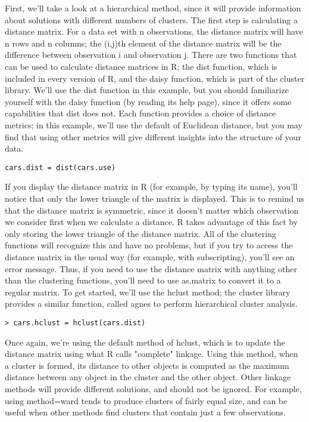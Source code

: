 {First, we'll take a look at a hierarchical method, since it will provide information about solutions with different numbers of clusters. The first step is calculating a distance matrix. For a data set with n observations, the distance matrix will have n rows and n columns; the (i,j)th element of the distance matrix will be the difference between observation i and observation j. There are two functions that can be used to calculate distance matrices in R; the dist function, which is included in every version of R, and the daisy function, which is part of the cluster library. We'll use the dist function in this example, but you should familiarize yourself with the daisy function (by reading its help page), since it offers some capabilities that dist does not. Each function provides a choice of distance metrics; in this example, we'll use the default of Euclidean distance, but you may find that using other metrics will give different insights into the structure of your data.
\begin{framed}
\begin{verbatim}
cars.dist = dist(cars.use)
\end{verbatim}
\end{framed}
If you display the distance matrix in R (for example, by typing its name), you'll notice that only the lower triangle of the matrix is displayed. This is to remind us that the distance matrix is symmetric, since it doesn't matter which observation we consider first when we calculate a distance. R takes advantage of this fact by only storing the lower triangle of the distance matrix. All of the clustering functions will recognize this and have no problems, but if you try to access the distance matrix in the usual way (for example, with subscripting), you'll see an error message. Thus, if you need to use the distance matrix with anything other than the clustering functions, you'll need to use as.matrix to convert it to a regular matrix.
To get started, we'll use the hclust method; the cluster library provides a similar function, called agnes to perform hierarchical cluster analysis.
\begin{framed}
\begin{verbatim}
> cars.hclust = hclust(cars.dist)
\end{verbatim}
\end{framed}
Once again, we're using the default method of hclust, which is to update the distance matrix using what R calls "complete" linkage. Using this method, when a cluster is formed, its distance to other objects is computed as the maximum distance between any object in the cluster and the other object. Other linkage methods will provide different solutions, and should not be ignored. For example, using method=ward tends to produce clusters of fairly equal size, and can be useful when other methods find clusters that contain just a few observations.
}
